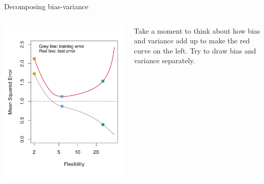 \documentclass[aspectratio=169]{beamer}
\begin{document}
\begin{frame}{Decomposing bias-variance}

\begin{columns}
\includegraphics[scale=0.25]{figures/islr2_9b.pdf}

Take a moment to think about how bias and variance add up to make the red curve on the left.  Try to draw bias and variance separately.  


\end{columns}
\end{frame}
\end{document}
